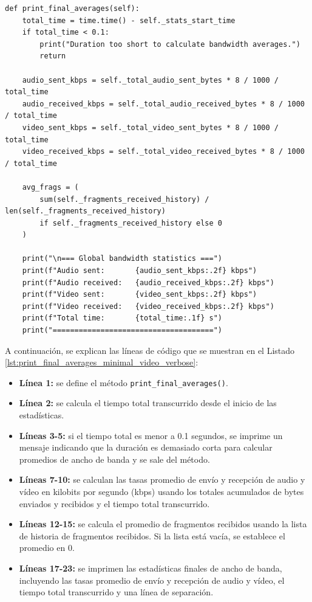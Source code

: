 \begin{lstlisting}[style=pythonstyle, caption={Método \texttt{print\_final\_averages()} de \textit{Minimal\_Video\_verbose}.}, label={lst:print_final_averages_minimal_video_verbose}]
def print_final_averages(self):
    total_time = time.time() - self._stats_start_time
    if total_time < 0.1:
        print("Duration too short to calculate bandwidth averages.")
        return

    audio_sent_kbps = self._total_audio_sent_bytes * 8 / 1000 / total_time
    audio_received_kbps = self._total_audio_received_bytes * 8 / 1000 / total_time
    video_sent_kbps = self._total_video_sent_bytes * 8 / 1000 / total_time
    video_received_kbps = self._total_video_received_bytes * 8 / 1000 / total_time

    avg_frags = (
        sum(self._fragments_received_history) / len(self._fragments_received_history)
        if self._fragments_received_history else 0
    )

    print("\n=== Global bandwidth statistics ===")
    print(f"Audio sent:       {audio_sent_kbps:.2f} kbps")
    print(f"Audio received:   {audio_received_kbps:.2f} kbps")
    print(f"Video sent:       {video_sent_kbps:.2f} kbps")
    print(f"Video received:   {video_received_kbps:.2f} kbps")
    print(f"Total time:       {total_time:.1f} s")
    print("=====================================")
\end{lstlisting}
\vspace{\baselineskip}

A continuación, se explican las líneas de código que se muestran en el Listado \ref{lst:print_final_averages_minimal_video_verbose}:
\begin{itemize}
    \item \textbf{Línea 1:} se define el método \texttt{print\_final\_averages()}.
    \item \textbf{Línea 2:} se calcula el tiempo total transcurrido desde el inicio de las estadísticas.
    \item \textbf{Líneas 3-5:} si el tiempo total es menor a 0.1 segundos, se imprime un mensaje indicando que la duración es demasiado corta para calcular promedios de ancho de banda y se sale del método.
    \item \textbf{Líneas 7-10:} se calculan las tasas promedio de envío y recepción de audio y vídeo en kilobits por segundo (kbps) usando los totales acumulados de bytes enviados y recibidos y el tiempo total transcurrido.
    \item \textbf{Líneas 12-15:} se calcula el promedio de fragmentos recibidos usando la lista de historia de fragmentos recibidos. Si la lista está vacía, se establece el promedio en 0.
    \item \textbf{Líneas 17-23:} se imprimen las estadísticas finales de ancho de banda, incluyendo las tasas promedio de envío y recepción de audio y vídeo, el tiempo total transcurrido y una línea de separación.
\end{itemize}

